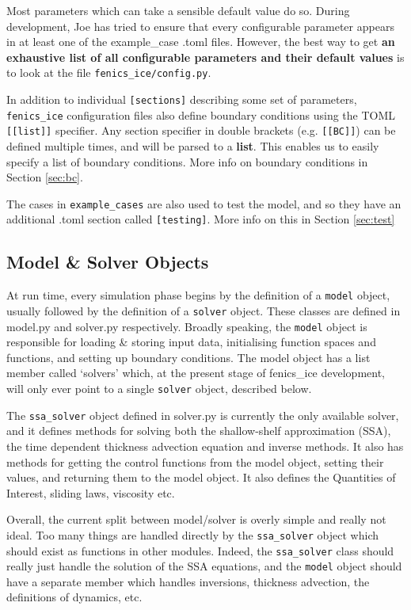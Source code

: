\documentclass[11pt, reqno, nocenter]{article}
\begin{document}
Most parameters which can take a sensible default value do so. During development, Joe has tried to ensure that every configurable parameter appears in at least one of the example\_case .toml files. However, the best way to get \textbf{an exhaustive list of all configurable parameters and their default values} is to look at the file {\tt fenics\_ice/config.py}.

In addition to individual {\tt [sections]} describing some set of parameters, {\tt fenics\_ice} configuration files also define boundary conditions using the TOML {\tt [[list]]} specifier. Any section specifier in double brackets (e.g. {\tt [[BC]]}) can be defined multiple times, and will be parsed to a \textbf{list}. This enables us to easily specify a list of boundary conditions. More info on boundary conditions in Section \ref{sec:bc}.

The cases in {\tt example\_cases} are also used to test the model, and so they have an additional .toml section called {\tt [testing]}. More info on this in Section \ref{sec:test}

\subsection{Model \& Solver Objects}

At run time, every simulation phase begins by the definition of a {\tt model} object, usually followed by the definition of a {\tt solver} object. These classes are defined in model.py and solver.py respectively. Broadly speaking, the {\tt model} object is responsible for loading \& storing input data, initialising function spaces and functions, and setting up boundary conditions. The model object has a list member called `solvers' which, at the present stage of fenics\_ice development, will only ever point to a single {\tt solver} object, described below.

The {\tt ssa\_solver} object defined in solver.py is currently the only available solver, and it defines methods for solving both the shallow-shelf approximation (SSA), the time dependent thickness advection equation and inverse methods. It also has methods for getting the control functions from the model object, setting their values, and returning them to the model object. It also defines the Quantities of Interest, sliding laws, viscosity etc.

Overall, the current split between model/solver is overly simple and really not ideal.
Too many things are handled directly by the {\tt ssa\_solver} object which should exist as functions in other modules.
Indeed, the {\tt ssa\_solver} class should really just handle the solution of the SSA equations, and the {\tt model} object should have a separate member which handles inversions, thickness advection, the definitions of dynamics, etc.
\end{document}
